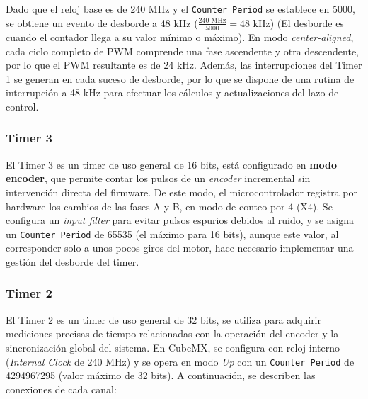 \documentclass[11pt]{report}
\begin{document}
Dado que el reloj base es de 240 MHz y el \texttt{Counter Period} se establece en 5000, se obtiene un evento de desborde a 48 kHz (\(\frac{240\text{ MHz}}{5000} = 48\text{ kHz}\)) (El desborde es cuando el contador llega a su valor mínimo o máximo). En modo \emph{center-aligned}, cada ciclo completo de PWM comprende una fase ascendente y otra descendente, por lo que el PWM resultante es de 24 kHz. Además, las interrupciones del Timer 1 se generan en cada suceso de desborde, por lo que se dispone de una rutina de interrupción a 48 kHz para efectuar los cálculos y actualizaciones del lazo de control.

\subsubsection{Timer 3}
El Timer 3 es un timer de uso general de 16 bits, está configurado en \textbf{modo encoder}, que permite contar los pulsos de un \emph{encoder} incremental sin intervención directa del firmware. De este modo, el microcontrolador registra por hardware los cambios de las fases A y B, en modo de conteo por 4 (X4). Se configura un \emph{input filter} para evitar pulsos espurios debidos al ruido, y se asigna un \texttt{Counter Period} de 65535 (el máximo para 16 bits), aunque este valor, al corresponder solo a unos pocos giros del motor, hace necesario implementar una gestión del desborde del timer.

\subsubsection{Timer 2}
El Timer 2 es un timer de uso general de 32 bits, se utiliza para adquirir mediciones precisas de tiempo relacionadas con la operación del encoder y la sincronización global del sistema. En CubeMX, se configura con reloj interno (\emph{Internal Clock} de 240 MHz) y se opera en modo \emph{Up} con un \texttt{Counter Period} de 4294967295 (valor máximo de 32 bits). A continuación, se describen las conexiones de cada canal:
\end{document}
